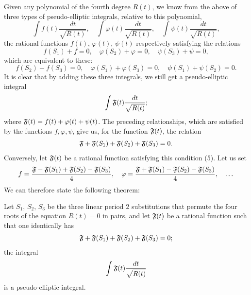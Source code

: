 \documentclass[11pt]{article}
\begin{document}
Given any polynomial of the fourth degree $R(t)$, we know from the above of three types of pseudo-elliptic integrals, relative to this polynomial,
\begin{equation*}
\int f(t)\frac{dt}{\sqrt{R(t)}}, \quad \int\varphi(t)\frac{dt}{\sqrt{R(t)}}, \quad \int\psi(t)\frac{dt}{\sqrt{R(t)}},
\end{equation*}
the rational functions $f(t)$, $\varphi(t)$, $\psi(t)$ respectively satisfying the relations
\begin{equation*}
f(S_{1})+f=0, \quad \varphi(S_{2})+\varphi=0, \quad \psi(S_{3})+\psi=0,
\end{equation*}
which are equivalent to these:
\begin{equation*}
f(S_{2})+f(S_{3})=0, \quad \varphi(S_{1})+\varphi(S_{3})=0, \quad \psi(S_{1})+\psi(S_{2})=0.
\end{equation*}
It is clear that by adding these three integrals, we still get a pseudo-elliptic integral
\begin{equation*}
\int\mathfrak{F}(t)\frac{dt}{\sqrt{R(t)}};
\end{equation*}
where $\mathfrak{F}(t)=f(t)+\varphi(t)+\psi(t)$. The preceding relationships, which are satisfied by the functions $f, \varphi, \psi$, give us, for the function $\mathfrak{F}(t)$, the relation
\begin{equation}
\mathfrak{F}+\mathfrak{F}(S_{1})+\mathfrak{F}(S_{2})+\mathfrak{F}(S_{3})=0.
\end{equation}
Conversely, let $\mathfrak{F}(t)$ be a rational function satisfying this condition (5). Let us set
\begin{equation*}
f=\frac{\mathfrak{F}-\mathfrak{F}(S_{1})+\mathfrak{F}(S_{2})-\mathfrak{F}(S_{3})}{4}, \quad \varphi=\frac{\mathfrak{F}+\mathfrak{F}(S_{1})-\mathfrak{F}(S_{2})-\mathfrak{F}(S_{3})}{4}, \quad \dots
\end{equation*}
We can therefore state the following theorem:

\begin{theorem}
Let $S_{1}$, $S_{2}$, $S_{3}$ be the three linear period 2 substitutions that permute the four roots of the equation $R(t)=0$ in pairs, and let $\mathfrak{F}(t)$ be a rational function such that one identically has
\begin{equation*}
\mathfrak{F}+\mathfrak{F}(S_{1})+\mathfrak{F}(S_{2})+\mathfrak{F}(S_{3})=0;
\end{equation*}
the integral
\begin{equation*}
\int\mathfrak{F}(t)\frac{dt}{\sqrt{R(t)}}
\end{equation*}
is a pseudo-elliptic integral.
\end{theorem}
\end{document}
